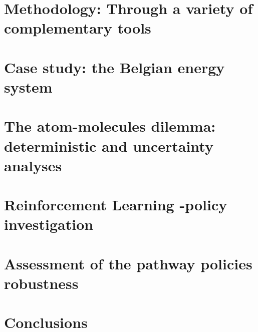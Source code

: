 \documentclass[a4paper,twoside,10pt,final]{memoir} %
\begin{document}
\chapter{Methodology: Through a variety of complementary tools}
\label{chap:chap_methodo}

\clearpage

\clearemptydoublepage
\chapter{Case study: the Belgian energy system} 
\label{chap:case_study}

\clearpage
%
%
%
\clearemptydoublepage
\chapter{The atom-molecules dilemma: deterministic and uncertainty analyses} 
\label{chap:atom_mol}

\clearpage


\clearemptydoublepage
\chapter{Reinforcement Learning -policy investigation}
\label{chap:chap_RL}

\clearpage

\clearemptydoublepage
\chapter{Assessment of the pathway policies robustness}
\label{chap:chap_RobPol}

\clearpage

%
\clearemptydoublepage
\chapter*[Conclusions]{Conclusions} 

\clearpage


\end{document}
